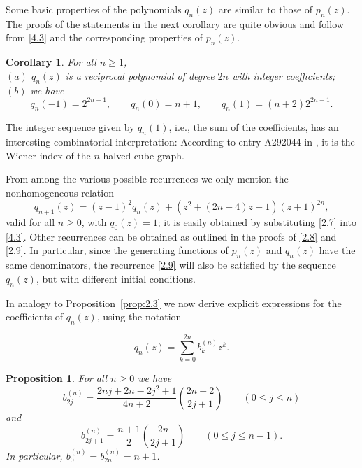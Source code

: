 \documentclass{amsart}
\theoremstyle{plain}
\newtheorem{corollary}[theorem]{Corollary}
\newtheorem{proposition}[theorem]{Proposition}
\numberwithin{equation}{section}
\begin{document}
Some basic properties of the polynomials $q_n(z)$ are similar to those of
$p_n(z)$. The proofs of the statements in the next corollary are quite obvious
and follow from \eqref{4.3} and the corresponding properties of $p_n(z)$.

\begin{corollary}\label{cor:4.2}
For all $n\geq 1$,\\
$(a)$\; $q_n(z)$ is a reciprocal polynomial of degree $2n$ with integer
coefficients;\\
$(b)$\; we have
\[
q_n(-1)=2^{2n-1},\qquad q_n(0)=n+1,\qquad q_n(1)=(n+2)2^{2n-1}.
\]
\end{corollary}

The integer sequence given by $q_n(1)$, i.e., the sum of the coefficients, has
an interesting combinatorial interpretation: According to entry A292044 in
\cite{OEIS}, it is the Wiener index of the $n$-halved cube graph.

From among the various possible recurrences we only mention the nonhomogeneous
relation
\[
q_{n+1}(z)=(z-1)^2q_n(z)+\left(z^2+(2n+4)z+1\right)(z+1)^{2n},
\]
valid for all $n\geq 0$, with $q_0(z)=1$; it is easily obtained by substituting
\eqref{2.7} into \eqref{4.3}. Other recurrences can be obtained as outlined in
the proofs of \eqref{2.8} and \eqref{2.9}. In particular, since the generating
functions of $p_n(z)$ and $q_n(z)$ have the same denominators, the recurrence
\eqref{2.9} will also be satisfied by the sequence $q_n(z)$, but with 
different initial conditions.

In analogy to Proposition~\ref{prop:2.3} we now derive explicit expressions
for the coefficients of $q_n(z)$, using the notation

\begin{equation}\label{4.6}
q_n(z) = \sum_{k=0}^{2n}b_k^{(n)} z^k.
\end{equation}

\begin{proposition}\label{prop:4.3}
For all $n\geq 0$ we have
\begin{equation}\label{4.7}
b_{2j}^{(n)}=\frac{2nj+2n-2j^2+1}{4n+2}\binom{2n+2}{2j+1}
\qquad(0\leq j\leq n)
\end{equation}
and
\begin{equation}\label{4.8}
b_{2j+1}^{(n)}=\frac{n+1}{2}\binom{2n}{2j+1}
\qquad(0\leq j\leq n-1).
\end{equation}
In particular, $b_0^{(n)}=b_{2n}^{(n)}=n+1$.
\end{proposition}
\end{document}
